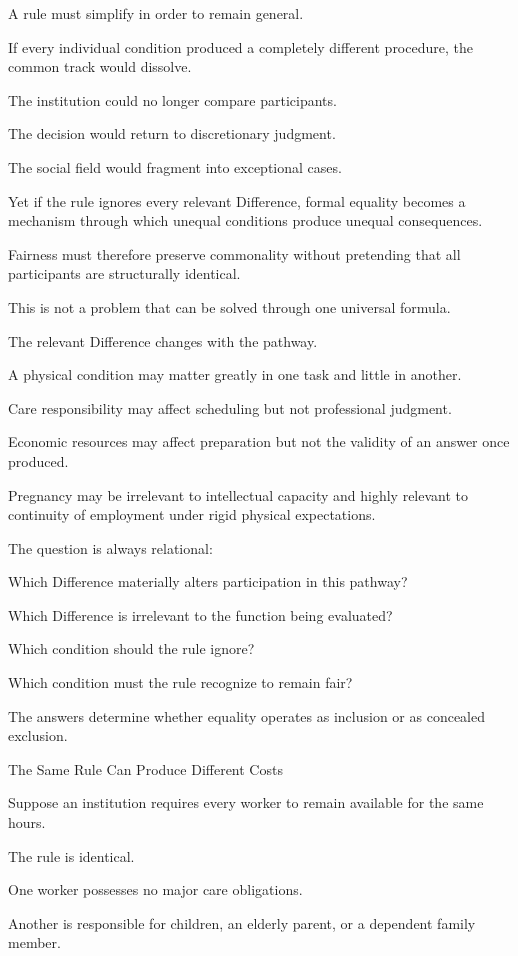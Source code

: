 A rule must simplify in order to remain general.

If every individual condition produced a completely different procedure, the common track would dissolve.

The institution could no longer compare participants.

The decision would return to discretionary judgment.

The social field would fragment into exceptional cases.

Yet if the rule ignores every relevant Difference, formal equality becomes a mechanism through which unequal conditions produce unequal consequences.

Fairness must therefore preserve commonality without pretending that all participants are structurally identical.

This is not a problem that can be solved through one universal formula.

The relevant Difference changes with the pathway.

A physical condition may matter greatly in one task and little in another.

Care responsibility may affect scheduling but not professional judgment.

Economic resources may affect preparation but not the validity of an answer once produced.

Pregnancy may be irrelevant to intellectual capacity and highly relevant to continuity of employment under rigid physical expectations.

The question is always relational:

Which Difference materially alters participation in this pathway?

Which Difference is irrelevant to the function being evaluated?

Which condition should the rule ignore?

Which condition must the rule recognize to remain fair?

The answers determine whether equality operates as inclusion or as concealed exclusion.

The Same Rule Can Produce Different Costs

Suppose an institution requires every worker to remain available for the same hours.

The rule is identical.

One worker possesses no major care obligations.

Another is responsible for children, an elderly parent, or a dependent family member.

